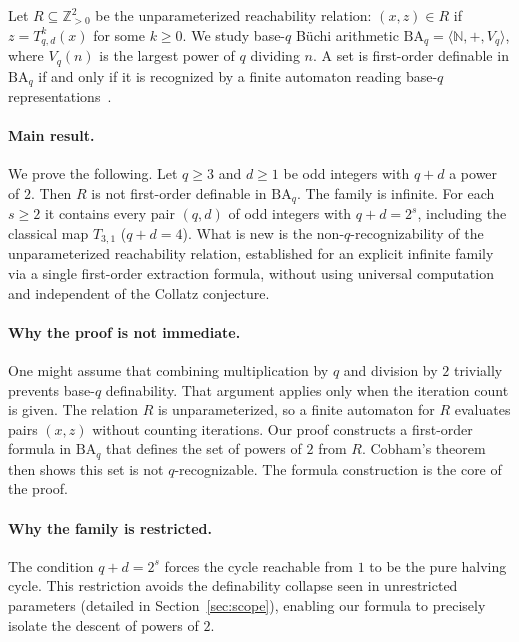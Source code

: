 \documentclass[runningheads]{llncs}
\begin{document}
Let $R \subseteq \mathbb{Z}_{>0}^2$ be the unparameterized reachability
relation: $(x,z) \in R$ if $z = T_{q,d}^k(x)$ for some $k \ge 0$. We
study base-$q$ B\"uchi arithmetic $\mathrm{BA}_q = \langle \mathbb{N},
+, V_q \rangle$, where $V_q(n)$ is the largest power of $q$ dividing
$n$. A set is first-order definable in $\mathrm{BA}_q$ if and only if it
is recognized by a finite automaton reading base-$q$
representations~\cite{Buchi,Bruyere}.

\paragraph{Main result.}
We prove the following. Let $q \ge 3$ and $d \ge 1$ be odd integers
with $q+d$ a power of $2$. Then $R$ is not first-order definable in
$\mathrm{BA}_q$. The family is infinite. For each $s \ge 2$ it contains
every pair $(q,d)$ of odd integers with $q+d = 2^s$, including the
classical map $T_{3,1}$ ($q+d = 4$). What is new is the non-$q$-recognizability of the unparameterized reachability relation, established for an explicit infinite family via a single first-order extraction formula, without using universal computation and independent of the Collatz conjecture.

\paragraph{Why the proof is not immediate.}
One might assume that combining multiplication by $q$ and division by
$2$ trivially prevents base-$q$ definability. That argument applies
only when the iteration count is given. The relation $R$ is
unparameterized, so a finite automaton for $R$ evaluates pairs $(x,z)$
without counting iterations. Our proof constructs a first-order formula
in $\mathrm{BA}_q$ that defines the set of powers of $2$ from $R$.
Cobham's theorem then shows this set is not $q$-recognizable. The
formula construction is the core of the proof.

\paragraph{Why the family is restricted.}
The condition $q+d = 2^s$ forces the cycle reachable from $1$ to be the pure halving cycle. This restriction avoids the definability collapse seen in unrestricted parameters (detailed in Section~\ref{sec:scope}), enabling our formula to precisely isolate the descent of powers of $2$. 
\end{document}
